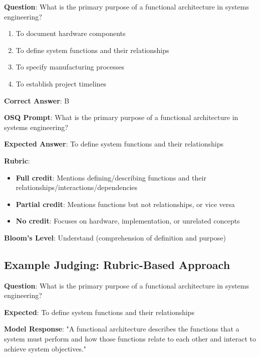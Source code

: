 \begin{tcolorbox}[title=Original MCQ]
\textbf{Question}: What is the primary purpose of a functional architecture in systems engineering?

\begin{enumerate}[label=\Alph*.]
    \item To document hardware components
    \item To define system functions and their relationships
    \item To specify manufacturing processes
    \item To establish project timelines
\end{enumerate}

\textbf{Correct Answer}: B
\end{tcolorbox}

\begin{tcolorbox}[title=Converted OSQ]
\textbf{OSQ Prompt}: What is the primary purpose of a functional architecture in systems engineering?

\textbf{Expected Answer}: To define system functions and their relationships

\textbf{Rubric}:
\begin{itemize}
    \item \textbf{Full credit}: Mentions defining/describing functions and their relationships/interactions/dependencies
    \item \textbf{Partial credit}: Mentions functions but not relationships, or vice versa
    \item \textbf{No credit}: Focuses on hardware, implementation, or unrelated concepts
\end{itemize}

\textbf{Bloom's Level}: Understand (comprehension of definition and purpose)
\end{tcolorbox}

\subsection{Example Judging: Rubric-Based Approach}

\begin{tcolorbox}[title=Question and Response]
\textbf{Question}: What is the primary purpose of a functional architecture in systems engineering?

\textbf{Expected}: To define system functions and their relationships

\textbf{Model Response}: "A functional architecture describes the functions that a system must perform and how those functions relate to each other and interact to achieve system objectives."
\end{tcolorbox}

